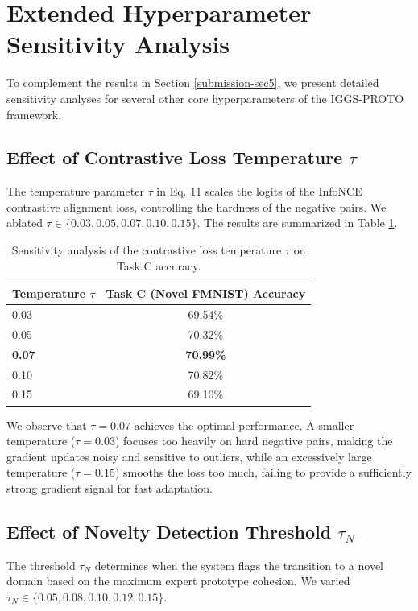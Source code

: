 \documentclass{article}
\theoremstyle{plain}
\theoremstyle{definition}
\theoremstyle{remark}
\begin{document}
\section{Extended Hyperparameter Sensitivity Analysis}
\label{app-sec:hyper}
To complement the results in Section \ref{submission-sec5}, we present detailed sensitivity analyses for several other core hyperparameters of the IGGS-PROTO framework.

\subsection{Effect of Contrastive Loss Temperature $\tau$}
The temperature parameter $\tau$ in Eq. 11 scales the logits of the InfoNCE contrastive alignment loss, controlling the hardness of the negative pairs. We ablated $\tau \in \{0.03, 0.05, 0.07, 0.10, 0.15\}$. The results are summarized in Table \ref{table:temp_sensitivity}.

\begin{table}[ht]
\caption{Sensitivity analysis of the contrastive loss temperature $\tau$ on Task C accuracy.}
\label{table:temp_sensitivity}
\vskip 0.15in
\begin{center}
\begin{small}
\begin{sc}
\begin{tabular}{lc}
\toprule
Temperature $\tau$ & Task C (Novel FMNIST) Accuracy \\
\midrule
0.03 & 69.54\% \\
0.05 & 70.32\% \\
\textbf{0.07} & \textbf{70.99\%} \\
0.10 & 70.82\% \\
0.15 & 69.10\% \\
\bottomrule
\end{tabular}
\end{sc}
\end{small}
\end{center}
\vskip -0.1in
\end{table}

We observe that $\tau = 0.07$ achieves the optimal performance. A smaller temperature ($\tau = 0.03$) focuses too heavily on hard negative pairs, making the gradient updates noisy and sensitive to outliers, while an excessively large temperature ($\tau = 0.15$) smooths the loss too much, failing to provide a sufficiently strong gradient signal for fast adaptation.

\subsection{Effect of Novelty Detection Threshold $\tau_N$}
The threshold $\tau_N$ determines when the system flags the transition to a novel domain based on the maximum expert prototype cohesion. We varied $\tau_N \in \{0.05, 0.08, 0.10, 0.12, 0.15\}$.
\end{document}
